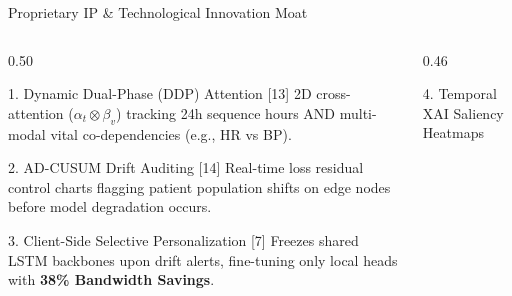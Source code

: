 \documentclass[aspectratio=169, 11pt]{beamer}
\begin{document}
\begin{frame}{Proprietary IP \& Technological Innovation Moat}
    \begin{columns}[c]
        \begin{column}{0.50\textwidth}
            \begin{block}{\textcolor{neonCyan}{1. Dynamic Dual-Phase (DDP) Attention [13]}}
                \tiny
                2D cross-attention ($\alpha_t \otimes \beta_v$) tracking 24h sequence hours AND multi-modal vital co-dependencies (e.g., HR vs BP).
            \end{block}
            
            \begin{block}{\textcolor{neonTeal}{2. AD-CUSUM Drift Auditing [14]}}
                \tiny
                Real-time loss residual control charts flagging patient population shifts on edge nodes before model degradation occurs.
            \end{block}

            \begin{block}{\textcolor{neonAmber}{3. Client-Side Selective Personalization [7]}}
                \tiny
                Freezes shared LSTM backbones upon drift alerts, fine-tuning only local heads with \textbf{38\% Bandwidth Savings}.
            \end{block}
        \end{column}
        
        \begin{column}{0.46\textwidth}
            \begin{block}{\textcolor{neonRose}{4. Temporal XAI Saliency Heatmaps}}
                \centering
                \vspace{0.2cm}
\end{block}
\end{column}
\end{columns}
\end{frame}
\end{document}
